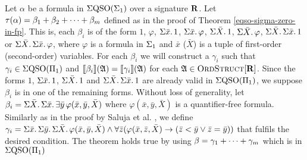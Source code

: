 Let $\alpha$ be a formula in $\Sigma{\rm QSO}(\Sigma_{1})$ over a signature $\mathbf{R}$. Let $\tau(\alpha) = \beta_1+\beta_2+\cdots+\beta_m$ defined as in the proof of Theorem \ref{eqso-sigma-zero-in-fp}. This is, each $\beta_i$ is of the form $1$, $\varphi$, $\Sigma{\bar{x}}.\,1$, $\Sigma{\bar{x}}.\,\varphi$, $\Sigma{\bar{X}}.\,1$, $\Sigma{\bar{X}}.\,\varphi$, $\Sigma{\bar{X}}.\,\Sigma{\bar{x}}.\,1$ or $\Sigma{\bar{X}}.\,\Sigma{\bar{x}}.\,\varphi$, where $\varphi$ is a formula in $\Sigma_{1}$ and $\bar{x}$ ($\bar{X}$) is a tuple of first-order (second-order) variables. For each $\beta_i$ we will construct a $\gamma_i$ such that $\gamma_i \in \Sigma{\rm QSO}(\Pi_{1})$ and ${\llbracket{}{\beta_i}\rrbracket}(\mathfrak{A}) = {\llbracket{}{\gamma_i}\rrbracket}(\mathfrak{A})$ for each $\mathfrak{A}\in\text{\sc OrdStruct}[\mathbf{R}]$. Since the forms $1$, $\Sigma{\bar{x}}.\,1$, $\Sigma{\bar{X}}.\,1$ and $\Sigma{\bar{X}}.\,\Sigma{\bar{x}}.\,1$ are already valid in $\Sigma{\rm QSO}(\Pi_{1})$, we suppose $\beta_i$ is in one of the remaining forms. Without loss of generality, let $\beta_i = \Sigma{\bar{X}}.\,\Sigma{\bar{x}}.\,\exists\bar{y}\,\varphi(\bar{x},\bar{y},\bar{X})$ where $\varphi(\bar{x},\bar{y},\bar{X})$ is a quantifier-free formula. Similarly as in the proof by Saluja et al. \cite{SalujaST95}, we define $\gamma_i = \Sigma{\bar{x}}.\,\Sigma{\bar{y}}.\,\Sigma{\bar{X}}.\,\varphi(\bar{x},\bar{y},\bar{X}) \wedge \forall\bar{z}(\varphi(\bar{x},\bar{z},\bar{X})\to(\bar{z} < \bar{y} \vee \bar{z} = \bar{y}))$ that fulfils the desired condition. The theorem holds true by using $\beta = \gamma_1+\cdots+\gamma_m$ which is in $\Sigma{\rm QSO}(\Pi_{1})$

%

